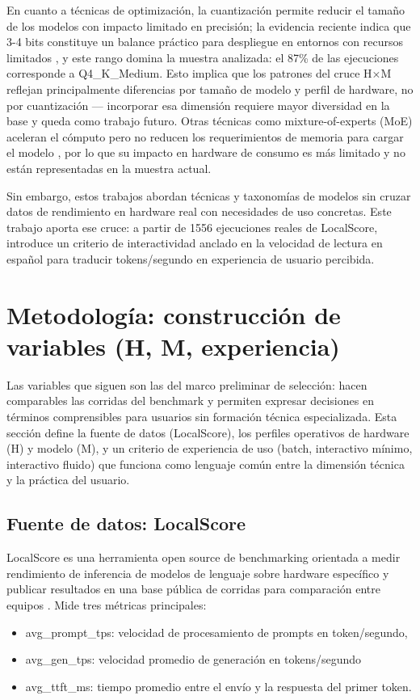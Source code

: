 \documentclass{llncs}
\begin{document}
En cuanto a técnicas de optimización, la cuantización permite reducir el tamaño de los modelos con impacto limitado en precisión; la evidencia reciente indica que 3-4 bits constituye un balance práctico para despliegue en entornos con recursos limitados \parencite{wang2025}, y este rango domina la muestra analizada: el 87\% de las ejecuciones corresponde a Q4\_K\_Medium. Esto implica que los patrones del cruce H×M reflejan principalmente diferencias por tamaño de modelo y perfil de hardware, no por cuantización — incorporar esa dimensión requiere mayor diversidad en la base y queda como trabajo futuro. Otras técnicas como mixture-of-experts (MoE) aceleran el cómputo pero no reducen los requerimientos de memoria para cargar el modelo \parencite{yi2023}, por lo que su impacto en hardware de consumo es más limitado y no están representadas en la muestra actual.

Sin embargo, estos trabajos abordan técnicas y taxonomías de modelos sin cruzar datos de rendimiento en hardware real con necesidades de uso concretas. Este trabajo aporta ese cruce: a partir de 1556 ejecuciones reales de LocalScore, introduce un criterio de interactividad anclado en la velocidad de lectura en español \parencite{brysbaert2019} para traducir tokens/segundo en experiencia de usuario percibida.

\section{Metodología: construcción de variables (H, M, experiencia)}\label{benchmark-y-definiciones}

Las variables que siguen son las del marco preliminar de selección: hacen comparables las corridas del benchmark y permiten expresar decisiones en términos comprensibles para usuarios sin formación técnica especializada. Esta sección define la fuente de datos (LocalScore), los perfiles operativos de hardware (H) y modelo (M), y un criterio de experiencia de uso (batch, interactivo mínimo, interactivo fluido) que funciona como lenguaje común entre la dimensión técnica y la práctica del usuario.

\subsection{Fuente de datos: LocalScore}\label{localscore-como-benchmark-y-fuente-de-datos}

LocalScore es una herramienta open source de benchmarking orientada a
medir rendimiento de inferencia de modelos de lenguaje sobre hardware
específico y publicar resultados en una base pública de corridas para
comparación entre equipos \parencite{mozillaLocalscore}. Mide tres métricas
principales: 
\begin{itemize}
    \item avg\_prompt\_tps: velocidad de procesamiento de prompts en token/segundo,
    \item avg\_gen\_tps: velocidad promedio de generación en tokens/segundo
    \item avg\_ttft\_ms: tiempo promedio entre el envío y la respuesta del primer token.
\end{itemize}
\end{document}
